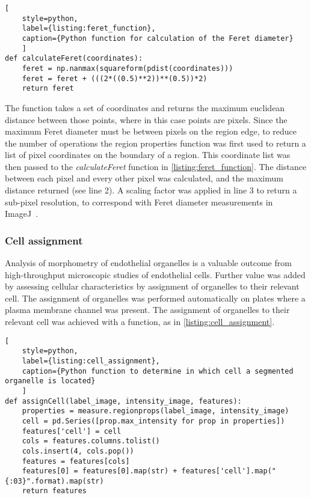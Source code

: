 \begin{lstlisting}[
	style=python,
	label={listing:feret_function},
	caption={Python function for calculation of the Feret diameter}
	]
def calculateFeret(coordinates):
    feret = np.nanmax(squareform(pdist(coordinates)))
    feret = feret + (((2*((0.5)**2))**(0.5))*2)
    return feret
\end{lstlisting}

The function takes a set of coordinates and returns the maximum euclidean distance between those points, where in this case points are pixels. Since the maximum Feret diameter must be between pixels on the region edge, to reduce the number of operations the region properties function was first used to return a list of pixel coordinates on the boundary of a region. This coordinate list was then passed to the \emph{calculateFeret} function in \autoref{listing:feret_function}. The distance between each pixel and every other pixel was calculated, and the maximum distance returned (see line 2). A scaling factor was applied in line 3 to return a sub-pixel resolution, to correspond with Feret diameter measurements in ImageJ~\cite{ImageJ2003}.

\subsubsection{Cell assignment}
\label{endothelial_morphometry:image_processing:cell_assignment}
Analysis of morphometry of endothelial organelles is a valuable outcome from high-throughput microscopic studies of endothelial cells. Further value was added by assessing cellular characteristics by assignment of organelles to their relevant cell. The assignment of organelles was performed automatically on plates where a plasma membrane channel was present. The assignment of organelles to their relevant cell was achieved with a function, as in \autoref{listing:cell_assignment}.

\begin{lstlisting}[
	style=python,
	label={listing:cell_assignment},
	caption={Python function to determine in which cell a segmented organelle is located}
	]
def assignCell(label_image, intensity_image, features):
    properties = measure.regionprops(label_image, intensity_image)
    cell = pd.Series([prop.max_intensity for prop in properties])
    features['cell'] = cell
    cols = features.columns.tolist()
    cols.insert(4, cols.pop())
    features = features[cols]
    features[0] = features[0].map(str) + features['cell'].map("{:03}".format).map(str)
    return features
\end{lstlisting}

